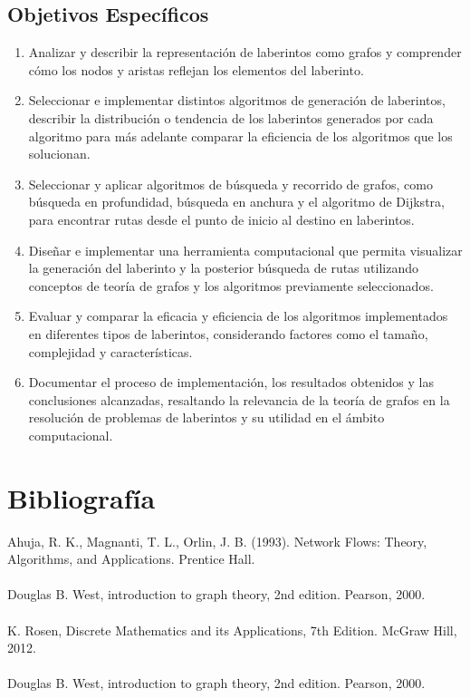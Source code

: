 \documentclass[conference]{IEEEtran}
\begin{document}
	\subsection{Objetivos Específicos}
	\vspace{0.3cm}
	\begin{enumerate}
		\item Analizar y describir la representación de laberintos como grafos y comprender cómo los nodos y aristas reflejan los elementos del laberinto.
		
		\item Seleccionar e implementar distintos algoritmos de generación de laberintos, describir la distribución o tendencia de los laberintos generados por cada algoritmo para más adelante comparar la eficiencia de los algoritmos que los solucionan.
		
		\item Seleccionar y aplicar algoritmos de búsqueda y recorrido de grafos, como búsqueda en profundidad, búsqueda en anchura y el algoritmo de Dijkstra, para encontrar rutas desde el punto de inicio al destino en laberintos.
		
		\item Diseñar e implementar una herramienta computacional que permita visualizar la generación del laberinto y la posterior búsqueda de rutas utilizando conceptos de teoría de grafos y los algoritmos previamente seleccionados.
		
		\item Evaluar y comparar la eficacia y eficiencia de los algoritmos implementados en diferentes tipos de laberintos, considerando factores como el tamaño, complejidad y características.
		
		\item Documentar el proceso de implementación, los resultados obtenidos y las conclusiones alcanzadas, resaltando la relevancia de la teoría de grafos en la resolución de problemas de laberintos y su utilidad en el ámbito computacional.
	\end{enumerate}
	
	
	\section{Bibliografía}
	Ahuja, R. K., Magnanti, T. L., Orlin, J. B. (1993). Network Flows: Theory, Algorithms, and Applications. Prentice Hall. \\
	\\
	Douglas B. West, introduction to graph theory, 2nd edition. Pearson, 2000.\\
	\\
	K. Rosen, Discrete Mathematics and its Applications, 7th Edition. McGraw Hill, 2012.\\
	\\
	Douglas B. West, introduction to graph theory, 2nd edition. Pearson, 2000.
	
	
	
\end{document}
